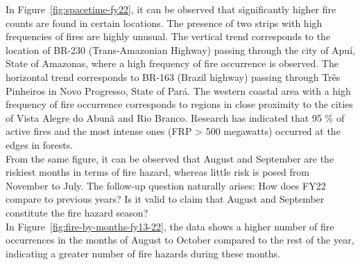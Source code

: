 \documentclass{article}\usepackage[]{graphicx}\usepackage[]{xcolor}
\begin{document}
\noindent
In Figure~\ref{fig:spacetime-fy22}, it can be observed that significantly higher fire counts are found in certain locations. The presence of two strips with high frequencies of fires are highly unusual.  The vertical trend corresponds to the location of BR-230 (Trans-Amazonian Highway) passing through the city of Apuí, State of Amazonas, where a high frequency of fire occurrence is observed.  The horizontal trend corresponds to BR-163 (Brazil highway) passing through Três Pinheiros in Novo Progresso, State of Pará. The western coastal area with a high frequency of fire occurrence corresponds to regions in close proximity to the cities of Vista Alegre do Abunã and Rio Branco. Research has indicated that 95 \% of active fires and the most intense ones (FRP > 500 megawatts) occurred at the edges in forests.\\

\noindent
From the same figure, it can be observed that August and September are the riskiest months in terms of fire hazard, whereas little risk is posed from November to July. The follow-up question naturally arises: How does FY22 compare to previous years? Is it valid to claim that August and September constitute the fire hazard season?\\

\noindent
In Figure~\ref{fig:fire-by-months-fy13-22}, the data shows a higher number of fire occurrences in the months of August to October compared to the rest of the year, indicating a greater number of fire hazards during these months.
\end{document}
